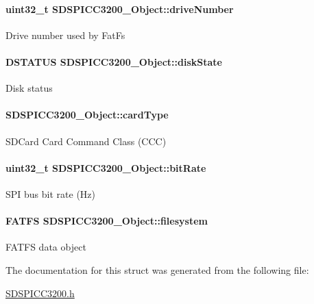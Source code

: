 \paragraph[{drive\-Number}]{\setlength{\rightskip}{0pt plus 5cm}uint32\-\_\-t S\-D\-S\-P\-I\-C\-C3200\-\_\-\-Object\-::drive\-Number}\label{struct_s_d_s_p_i_c_c3200___object_a79ac1ce3451b5ef57859a289ae9fec22}
Drive number used by Fat\-Fs 
\paragraph[{disk\-State}]{\setlength{\rightskip}{0pt plus 5cm}D\-S\-T\-A\-T\-U\-S S\-D\-S\-P\-I\-C\-C3200\-\_\-\-Object\-::disk\-State}\label{struct_s_d_s_p_i_c_c3200___object_ab2616f0419bf15e11e2e066d2af1de49}
Disk status 
\paragraph[{card\-Type}]{ S\-D\-S\-P\-I\-C\-C3200\-\_\-\-Object\-::card\-Type}\label{struct_s_d_s_p_i_c_c3200___object_a4b78b0482f55e904320e627d88979261}
S\-D\-Card Card Command Class (C\-C\-C) 
\paragraph[{bit\-Rate}]{\setlength{\rightskip}{0pt plus 5cm}uint32\-\_\-t S\-D\-S\-P\-I\-C\-C3200\-\_\-\-Object\-::bit\-Rate}\label{struct_s_d_s_p_i_c_c3200___object_a835314275c71a9e04b55e79c01963603}
S\-P\-I bus bit rate (Hz) 
\paragraph[{filesystem}]{\setlength{\rightskip}{0pt plus 5cm}F\-A\-T\-F\-S S\-D\-S\-P\-I\-C\-C3200\-\_\-\-Object\-::filesystem}\label{struct_s_d_s_p_i_c_c3200___object_abe597d34136c1852c3c39971255b2204}
F\-A\-T\-F\-S data object 

The documentation for this struct was generated from the following file\-:\begin{DoxyCompactItemize}
\item 
\hyperlink{_s_d_s_p_i_c_c3200_8h}{S\-D\-S\-P\-I\-C\-C3200.\-h}\end{DoxyCompactItemize}
